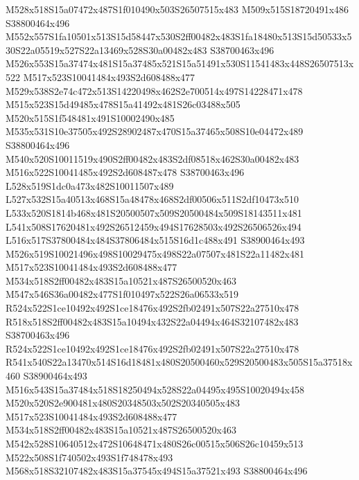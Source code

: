 \documentclass{article}
\begin{document}
\begin{multicols}{2}
M528x518S15a07472x487S1f010490x503S26507515x483 M509x515S18720491x486 S38800464x496 M552x557S1fa10501x513S15d58447x530S2ff00482x483S1fa18480x513S15d50533x530S22a05519x527S22a13469x528S30a00482x483 S38700463x496 M526x553S15a37474x481S15a37485x521S15a51491x530S11541483x448S26507513x522 M517x523S10041484x493S2d608488x477 M529x538S2e74c472x513S14220498x462S2e700514x497S14228471x478 M515x523S15d49485x478S15a41492x481S26c03488x505 M520x515S1f548481x491S10002490x485 M535x531S10e37505x492S28902487x470S15a37465x508S10e04472x489 S38800464x496 M540x520S10011519x490S2ff00482x483S2df08518x462S30a00482x483 M516x522S10041485x492S2d608487x478 S38700463x496 L528x519S1dc0a473x482S10011507x489 L527x532S15a40513x468S15a48478x468S2df00506x511S2df10473x510 L533x520S1814b468x481S20500507x509S20500484x509S18143511x481 L541x508S17620481x492S26512459x494S17628503x492S26506526x494 L516x517S37800484x484S37806484x515S16d1c488x491 S38900464x493 M526x519S10021496x498S10029475x498S22a07507x481S22a11482x481 M517x523S10041484x493S2d608488x477 M534x518S2ff00482x483S15a10521x487S26500520x463 M547x546S36a00482x477S1f010497x522S26a06533x519 R524x522S1ce10492x492S1ce18476x492S2fb02491x507S22a27510x478 R518x518S2ff00482x483S15a10494x432S22a04494x464S32107482x483 S38700463x496 R524x522S1ce10492x492S1ce18476x492S2fb02491x507S22a27510x478 R541x540S22a13470x514S16d18481x480S20500460x529S20500483x505S15a37518x460 S38900464x493 M516x543S15a37484x518S18250494x528S22a04495x495S10020494x458 M520x520S2e900481x480S20348503x502S20340505x483 M517x523S10041484x493S2d608488x477 M534x518S2ff00482x483S15a10521x487S26500520x463 M542x528S10640512x472S10648471x480S26c00515x506S26c10459x513 M522x508S1f740502x493S1f748478x493 M568x518S32107482x483S15a37545x494S15a37521x493 S38800464x496






\end{multicols}
\end{document}
